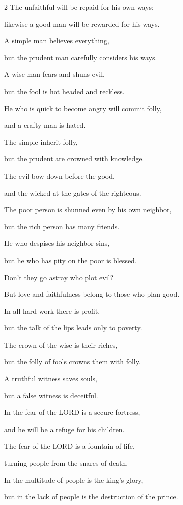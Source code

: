 \begin{multicols}{2}
\myverse{}The unfaithful will be repaid for his own ways;

likewise a good man will be rewarded for his ways.


\myverse{}A simple man believes everything,

but the prudent man carefully considers his ways.


\myverse{}A wise man fears and shuns evil,

but the fool is hot headed and reckless.


\myverse{}He who is quick to become angry will commit folly,

and a crafty man is hated.


\myverse{}The simple inherit folly,

but the prudent are crowned with knowledge.


\myverse{}The evil bow down before the good,

and the wicked at the gates of the righteous.


\myverse{}The poor person is shunned even by his own neighbor,

but the rich person has many friends.


\myverse{}He who despises his neighbor sins,

but he who has pity on the poor is blessed.


\myverse{}Don’t they go astray who plot evil?

But love and faithfulness belong to those who plan good.


\myverse{}In all hard work there is profit,

but the talk of the lips leads only to poverty.


\myverse{}The crown of the wise is their riches,

but the folly of fools crowns them with folly.


\myverse{}A truthful witness saves souls,

but a false witness is deceitful.


\myverse{}In the fear of the LORD is a secure fortress,

and he will be a refuge for his children.


\myverse{}The fear of the LORD is a fountain of life,

turning people from the snares of death.


\myverse{}In the multitude of people is the king’s glory,

but in the lack of people is the destruction of the prince.



\end{multicols}
